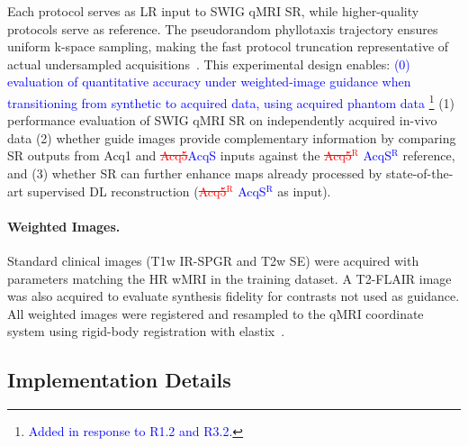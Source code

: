 \documentclass[journal,twoside,web]{ieeecolor}
\newcommand{\added}[1]{\textcolor{blue}{#1}}      %
\newcommand{\deleted}[1]{\textcolor{red}{\st{#1}}} %
\begin{document}
Each protocol serves as LR input to SWIG qMRI SR, while higher-quality protocols serve as reference. The pseudorandom phyllotaxis trajectory ensures uniform k-space sampling, making the fast protocol truncation representative of actual undersampled acquisitions~\cite{b13,b14,b20}. This experimental design enables: \added{(0) evaluation of quantitative 
accuracy under weighted-image guidance when transitioning from synthetic 
to acquired data, using acquired phantom data \footnote{\textcolor{blue}{Added in response to R1.2 and R3.2.}}} (1)  performance evaluation of SWIG qMRI SR on independently acquired in-vivo data (2) whether guide images provide complementary information by comparing SR outputs from Acq1 and \deleted{Acq5}\added{AcqS} inputs against the \deleted{Acq5$^{\text{R}}$} \added{AcqS$^{\text{R}}$} reference, and (3) whether SR can further enhance maps already processed by state-of-the-art supervised DL reconstruction (\deleted{Acq5$^{\text{R}}$} \added{AcqS$^{\text{R}}$} as input).

\paragraph{Weighted Images.}
Standard clinical images (T1w IR-SPGR and T2w SE) were acquired with parameters matching the HR wMRI in the training dataset. A T2-FLAIR image was also acquired to evaluate synthesis fidelity for contrasts not used as guidance. All weighted images were registered and resampled to the qMRI coordinate system using rigid-body registration with elastix~\cite{b21,b22}.


\subsection{Implementation Details}
\end{document}
